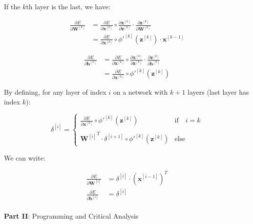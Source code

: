 \documentclass[12pt]{article}
\begin{document}
\begin{enumerate}[leftmargin=\labelsep]
    If the $k$th layer is the last, we have:

    \begin{equation}
    \begin{aligned}
        \frac{\partial E}{\partial \mathbf{W}^{[k]}} &= \frac{\partial E}{\partial \mathbf{x}^{[k]}} \circ \frac{\partial \mathbf{x}^{[k]}}{\partial \mathbf{z}^{[k]}} \cdot \frac{\partial \mathbf{z}^{[k]}}{\partial \mathbf{W}^{[k]}} \\
        &= \frac{\partial E}{\partial \mathbf{x}^{[k]}} \circ \phi'^{[k]}(\mathbf{z}^{[k]}) \cdot \mathbf{x}^{[k-1]}
    \end{aligned}
    \end{equation}

    \begin{equation}
    \begin{aligned}
        \frac{\partial E}{\partial \mathbf{b}^{[k]}} &= \frac{\partial E}{\partial \mathbf{x}^{[k]}} \circ \frac{\partial \mathbf{x}^{[k]}}{\partial \mathbf{z}^{[k]}} \cdot \frac{\partial \mathbf{z}^{[k]}}{\partial \mathbf{b}^{[k]}} \\
        &= \frac{\partial E}{\partial \mathbf{x}^{[k]}} \circ \phi'^{[k]}(\mathbf{z}^{[k]})
    \end{aligned}
    \end{equation}

    By defining, for any layer of index $i$ on a network with $k+1$ layers (last layer has index $k$):

    \begin{equation}
        \delta^{[i]} = \left\{
        \begin{array}{ll}
            \frac{\partial E}{\partial \mathbf{x}^{[k]}} \circ \phi'^{[k]}(\mathbf{z}^{[k]}) & \textrm{if} \quad i = k \\
            \\
            {\mathbf{W}^{[i]}}^T \cdot \delta^{[i+1]} \circ \phi'^{[k]}(\mathbf{z}^{[k]})  & \textrm{else}
        \end{array} 
        \right.
    \end{equation}

    We can write:

    \begin{equation}
    \begin{aligned}
        \frac{\partial E}{\partial \mathbf{W}^{[i]}} &= \delta^{[i]} \cdot {(\mathbf{x}^{[i-1]})}^T \\
        \frac{\partial E}{\partial \mathbf{b}^{[i]}} &= \delta^{[i]} \\
    \end{aligned}
    \end{equation}

\end{enumerate}

\vskip 1cm

\large{\textbf{Part II}: Programming and Critical Analysis}\normalsize
\end{document}
